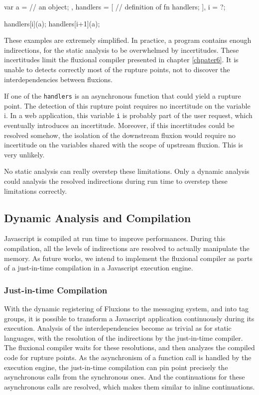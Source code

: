 \begin{code}[js,
  caption={Two levels of indirection},
  label={lst:indirections}]
var a = {
      // an object;
    },
    handlers = [
      // definition of fn handlers;
    ],
    i = ?;

handlers[i](a);
handlers[i+1](a);
\end{code}

These examples are extremely simplified.
In practice, a program contains enough indirections, for the static analysis to be overwhelmed by incertitudes.
These incertitudes limit the fluxional compiler presented in chapter \ref{chpater6}.
It is unable to detects correctly most of the rupture points, not to discover the interdependencies between fluxions.

If one of the \texttt{handlers} is an asynchronous function that could yield a rupture point.
The detection of this rupture point requires no incertitude on the variable i.
In a web application, this variable \texttt{i} is probably part of the user request, which eventually introduces an incertitude.
Moreover, if this incertitudes could be resolved somehow, the isolation of the downstream fluxion would require no incertitude on the variables shared with the scope of upstream fluxion.
This is very unlikely.

No static analysis can really overstep these limitations.
Only a dynamic analysis could analysis the resolved indirections during run time to overstep these limitations correctly.

\subsection{Dynamic Analysis and Compilation}

Javascript is compiled at run time to improve performances.
During this compilation, all the levels of indirections are resolved to actually manipulate the memory.
As future works, we intend to implement the fluxional compiler as parts of a just-in-time compilation in a Javascript execution engine.

\subsubsection{Just-in-time Compilation}

With the dynamic registering of Fluxions to the messaging system, and into tag groups, it is possible to transform a Javascript application continuously during its execution.
Analysis of the interdependencies become as trivial as for static languages, with the resolution of the indirections by the just-in-time compiler.
The fluxional compiler waits for these resolutions, and then analyzes the compiled code for rupture points.
As the asynchronism of a function call is handled by the execution engine, the just-in-time compilation can pin point precisely the asynchronous calls from the synchronous ones. 
And the continuations for these asynchronous calls are resolved, which makes them similar to inline continuations.

